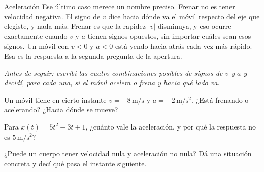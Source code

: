 \documentclass[11pt,openany]{book}
\begin{document}
\begin{bloque}{Aceleración}
Ese último caso merece un nombre preciso. Frenar no es tener velocidad negativa. El signo de $v$ dice hacia dónde va el móvil respecto del eje que elegiste, y nada más. Frenar es que la rapidez $\lvert v\rvert$ disminuya, y eso ocurre exactamente cuando $v$ y $a$ tienen signos opuestos, sin importar cuáles sean esos signos. Un móvil con $v<0$ y $a<0$ está yendo hacia atrás cada vez más rápido. Esa es la respuesta a la segunda pregunta de la apertura.

\textit{Antes de seguir: escribí las cuatro combinaciones posibles de signos de $v$ y $a$ y decidí, para cada una, si el móvil acelera o frena y hacia qué lado va.}
\end{bloque}

\begin{chequeo}
\item Un móvil tiene en cierto instante $v = -8\,\mathrm{m/s}$ y $a = +2\,\mathrm{m/s^2}$. ¿Está frenando o acelerando? ¿Hacia dónde se mueve?
\item Para $x(t) = 5t^2 - 3t + 1$, ¿cuánto vale la aceleración, y por qué la respuesta no es $5\,\mathrm{m/s^2}$?
\item ¿Puede un cuerpo tener velocidad nula y aceleración no nula? Dá una situación concreta y decí qué pasa el instante siguiente.
\end{chequeo}
\end{document}
